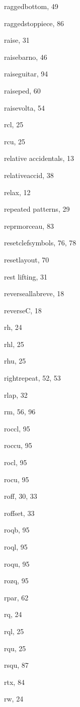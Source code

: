 \begin{theindex}
  \item {\Bslash raggedbottom}, 49
  \item {\Bslash raggedstoppiece}, 86
  \item {\Bslash raise}, 31
  \item {\Bslash raisebarno}, 46
  \item {\Bslash raiseguitar}, 94
  \item {\Bslash raiseped}, 60
  \item {\Bslash raisevolta}, 54
  \item {\Bslash rcl}, 25
  \item {\Bslash rcu}, 25
  \item relative accidentals, 13
  \item {\Bslash relativeaccid}, 38
  \item {\Bslash relax}, 12
  \item repeated patterns, 29
  \item {\Bslash reprmorceau}, 83
  \item {\Bslash resetclefsymbols}, 76, 78
  \item {\Bslash resetlayout}, 70
  \item rest lifting, 31
  \item {\Bslash reverseallabreve}, 18
  \item {\Bslash reverseC}, 18
  \item {\Bslash rh}, 24
  \item {\Bslash rhl}, 25
  \item {\Bslash rhu}, 25
  \item {\Bslash rightrepeat}, 52, 53
  \item {\Bslash rlap}, 32
  \item {\Bslash rm}, 56, 96
  \item {\Bslash roccl}, 95
  \item {\Bslash roccu}, 95
  \item {\Bslash rocl}, 95
  \item {\Bslash rocu}, 95
  \item {\Bslash roff}, 30, 33
  \item {\Bslash roffset}, 33
  \item {\Bslash roqb}, 95
  \item {\Bslash roql}, 95
  \item {\Bslash roqu}, 95
  \item {\Bslash rozq}, 95
  \item {\Bslash rpar}, 62
  \item {\Bslash rq}, 24
  \item {\Bslash rql}, 25
  \item {\Bslash rqu}, 25
  \item {\Bslash rsqu}, 87
  \item {\Bslash rtx}, 84
  \item {\Bslash rw}, 24


\end{theindex}
